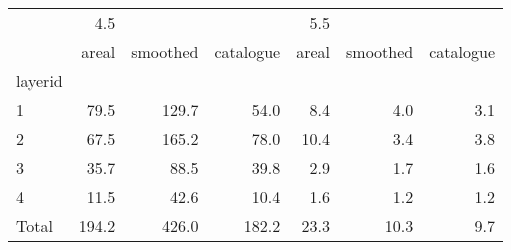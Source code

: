 \begin{tabular}{lrrrrrr}
\toprule
{} &    4.5 &          &           &   5.5 &          &           \\
{} &  areal & smoothed & catalogue & areal & smoothed & catalogue \\
\midrule
layerid &        &          &           &       &          &           \\
1       &   79.5 &    129.7 &      54.0 &   8.4 &      4.0 &       3.1 \\
2       &   67.5 &    165.2 &      78.0 &  10.4 &      3.4 &       3.8 \\
3       &   35.7 &     88.5 &      39.8 &   2.9 &      1.7 &       1.6 \\
4       &   11.5 &     42.6 &      10.4 &   1.6 &      1.2 &       1.2 \\
Total   &  194.2 &    426.0 &     182.2 &  23.3 &     10.3 &       9.7 \\
\bottomrule
\end{tabular}

